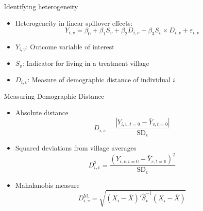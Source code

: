 \documentclass[14pt, aspectratio=169]{beamer}
\begin{document}
\begin{frame}{Identifying heterogeneity}
\begin{itemize}
	\item Heterogeneity in linear spillover effects:
	\begin{equation*} \label{eq:interaction}
	Y_{i,v} = \beta_0 + \beta_1 S_v + \beta_2 D_{i,v} + \beta_3 S_v \times  D_{i,v} + \varepsilon_{i,v}
	\end{equation*}

	\item $Y_{i,v}$: Outcome variable of interest
    \item $S_v$: Indicator for living in a treatment village
    \item $D_{i,v}$: Measure of demographic distance of individual $i$

\end{itemize}
\end{frame}

\begin{frame}{Measuring Demographic Distance}
\begin{itemize}
	\item Absolute distance
	$$D_{i,v}  = \frac{|Y_{i,v,t=0} - \bar Y_{v,t=0}|}{\text{SD}_v} $$
	\item Squared deviations from village averages
	$$ D^2_{i,v}= \frac{(Y_{i,v,t=0} - \bar Y_{v,t=0})^2}{\text{SD}_v} $$
	\item Mahalanobis measure
	$$D^\text{M.}_{i,v} = \sqrt{( X_i - {\bar X})' {\hat S}^{-1}_v ( X_i - {\bar X})}  $$
\end{itemize}
\end{frame}
\end{document}
